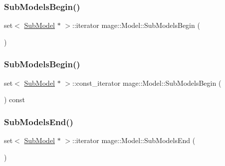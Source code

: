 \hypertarget{classmage_1_1_model_a8845f0db130f224f41132996a206c354}{}\label{classmage_1_1_model_a8845f0db130f224f41132996a206c354} 
\subsubsection{\texorpdfstring{Sub\+Models\+Begin()}{SubModelsBegin()}\hspace{0.1cm}{\footnotesize\ttfamily [1/2]}}
{\footnotesize\ttfamily set$<$ \hyperlink{classmage_1_1_sub_model}{Sub\+Model} $\ast$ $>$\+::iterator mage\+::\+Model\+::\+Sub\+Models\+Begin (\begin{DoxyParamCaption}{ }\end{DoxyParamCaption})}

\hypertarget{classmage_1_1_model_a043f7ac7bbaa1bd60bec3bc517428775}{}\label{classmage_1_1_model_a043f7ac7bbaa1bd60bec3bc517428775} 
\subsubsection{\texorpdfstring{Sub\+Models\+Begin()}{SubModelsBegin()}\hspace{0.1cm}{\footnotesize\ttfamily [2/2]}}
{\footnotesize\ttfamily set$<$ \hyperlink{classmage_1_1_sub_model}{Sub\+Model} $\ast$ $>$\+::const\+\_\+iterator mage\+::\+Model\+::\+Sub\+Models\+Begin (\begin{DoxyParamCaption}{ }\end{DoxyParamCaption}) const}

\hypertarget{classmage_1_1_model_a44e7b26f9852046aa96dc41c01222a04}{}\label{classmage_1_1_model_a44e7b26f9852046aa96dc41c01222a04} 
\subsubsection{\texorpdfstring{Sub\+Models\+End()}{SubModelsEnd()}\hspace{0.1cm}{\footnotesize\ttfamily [1/2]}}
{\footnotesize\ttfamily set$<$ \hyperlink{classmage_1_1_sub_model}{Sub\+Model} $\ast$ $>$\+::iterator mage\+::\+Model\+::\+Sub\+Models\+End (\begin{DoxyParamCaption}{ }\end{DoxyParamCaption})}

